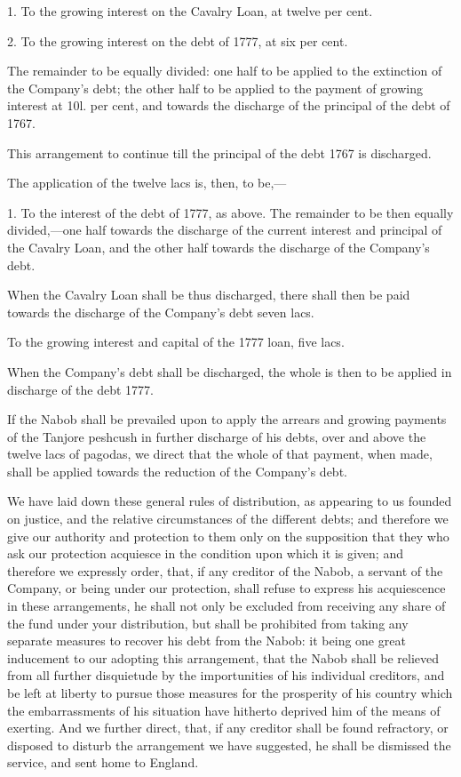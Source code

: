 1. To the growing interest on the Cavalry Loan, at twelve per cent.

2. To the growing interest on the debt of 1777, at six per cent.

The remainder to be equally divided: one half to be applied to the extinction of the Company's debt; the other half to be applied to the payment of growing interest at 10l. per cent, and towards the discharge of the principal of the debt of 1767.

This arrangement to continue till the principal of the debt 1767 is discharged.

The application of the twelve lacs is, then, to be,—

1. To the interest of the debt of 1777, as above. The remainder to be then equally divided,—one half towards the discharge of the current interest and principal of the Cavalry Loan, and the other half towards the discharge of the Company's debt.

When the Cavalry Loan shall be thus discharged, there shall then be paid towards the discharge of the Company's debt seven lacs.

To the growing interest and capital of the 1777 loan, five lacs.

When the Company's debt shall be discharged, the whole is then to be applied in discharge of the debt 1777.

If the Nabob shall be prevailed upon to apply the arrears and growing payments of the Tanjore peshcush in further discharge of his debts, over and above the twelve lacs of pagodas, we direct that the whole of that payment, when made, shall be applied towards the reduction of the Company's debt.

We have laid down these general rules of distribution, as appearing to us founded on justice, and the relative circumstances of the different debts; and therefore we give our authority and protection to them only on the supposition that they who ask our protection acquiesce in the condition upon which it is given; and therefore we expressly order, that, if any creditor of the Nabob, a servant of the Company, or being under our protection, shall refuse to express his acquiescence in these arrangements, he shall not only be excluded from receiving any share of the fund under your distribution, but shall be prohibited from taking any separate measures to recover his debt from the Nabob: it being one great inducement to our adopting this arrangement, that the Nabob shall be relieved from all further disquietude by the importunities of his individual creditors, and be left at liberty to pursue those measures for the prosperity of his country which the embarrassments of his situation have hitherto deprived him of the means of exerting. And we further direct, that, if any creditor shall be found refractory, or disposed to disturb the arrangement we have suggested, he shall be dismissed the service, and sent home to England.

